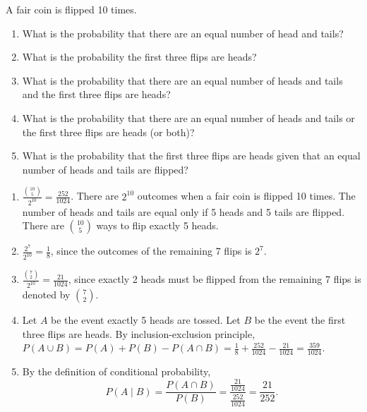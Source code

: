 \documentclass{article}
\theoremstyle{definition}
\begin{document}
\begin{question}
        A fair coin is flipped 10 times.
    \begin{enumerate}
        \item What is the probability that there are an equal number of head and
            tails?
        \item What is the probability the first three flips are heads?
        \item What is the probability that there are an equal number of heads
            and tails and the first three flips are heads?
        \item What is the probability that there are an equal number of heads
            and tails or the first three flips are heads (or both)?
        \item What is the probability that the first three flips are heads given
            that an equal number of heads and tails are flipped?
    \end{enumerate}
\end{question}
\begin{solution}
    \begin{enumerate}
        \item $\frac{\binom{10}{5}}{2^{10}} = \frac{252}{1024}$.  There are
            $2^{10}$ outcomes when a fair coin is flipped 10 times.  The number
            of heads and tails are equal only if 5 heads and 5 tails are
            flipped.  There are $\binom{10}{5}$ ways to flip exactly 5 heads.
        \item $\frac{2^7}{2^{10}} = \frac{1}{8}$, since the outcomes of the
            remaining 7 flips is $2^7$.
        \item $\frac{\binom{7}{2}}{2^{10}} = \frac{21}{1024}$, since exactly 2
            heads must be flipped from the remaining 7 flips is denoted by
        $\binom{7}{2}$.
        \item Let $A$ be the event exactly 5 heads are tossed.  Let $B$ be the
            event the first three flips are heads.  By inclusion-exclusion
            principle, $P(A\cup B) = P(A) + P(B) - P(A\cap B)= \frac{1}{8} +
            \frac{252}{1024} - \frac{21}{1024} = \frac{359}{1024}$.
        \item By the definition of conditional probability,
        \[
            P(A \mid B) = \frac{P(A \cap B)}{P(B)} = \frac{\frac{21}{1024}}{\frac{252}{1024}} =
                \frac{21}{252}.
        \]
    \end{enumerate}
\end{solution}
\end{document}
